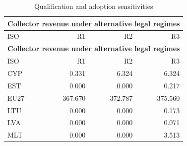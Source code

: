{\small\setlength{\LTpre}{4pt}\setlength{\LTpost}{4pt}
\begin{longtable}{@{}lrrr@{}}
\caption{Qualification and adoption sensitivities}\label{tab:tab_v2_app_table7_regime_sensitivities} \\
\multicolumn{4}{l}{\textbf{Collector revenue under alternative legal regimes}} \\
\toprule
ISO & R1 & R2 & R3 \\
\midrule
\endfirsthead
\multicolumn{4}{l}{\textbf{Collector revenue under alternative legal regimes}} \\
\toprule
ISO & R1 & R2 & R3 \\
\midrule
\endhead
\midrule
\endfoot
\bottomrule
\endlastfoot
CYP &   0.331 &   6.324 &   6.324 \\
EST &   0.000 &   0.000 &   0.217 \\
EU27 & 367.670 & 372.787 & 375.560 \\
LTU &   0.000 &   0.000 &   0.173 \\
LVA &   0.000 &   0.000 &   0.071 \\
MLT &   0.000 &   0.000 &   3.513 \\
\end{longtable}
\par{}\par
}
